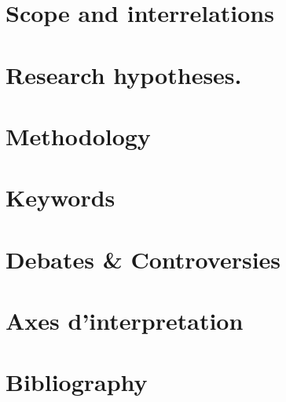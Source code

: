 \documentclass[paper=B6,portrait,twoside=true,twocolumn=false,headinclude=true,footinclude=false,fontsize=12,BCOR=10mm,DIV=calc,pagesize=auto,titlepage=firstiscover,mpinclude=false,headings=normal,headings=twolinechapter,open=right,toc=graduated,chapterprefix=false,numbers=endperiod,parskip=half+]{scrbook}
\theoremstyle{definition}
\begin{document}
\section{Scope and interrelations}
\label{sec:org9d16ef3}
\lipsum
\section{Research hypotheses.}
\label{sec:orgcd1913b}
\lipsum
\section{Methodology}
\label{sec:orgc1d07d2}
\lipsum
\section{Keywords}
\label{sec:orgaa0aaa1}
\lipsum
\section{Debates \& Controversies}
\label{sec:org79cccb2}
\lipsum
\section{Axes d'interpretation}
\label{sec:org5c1e906}
\lipsum
\section{Bibliography}
\label{sec:orgfa9eba8}
\end{document}
